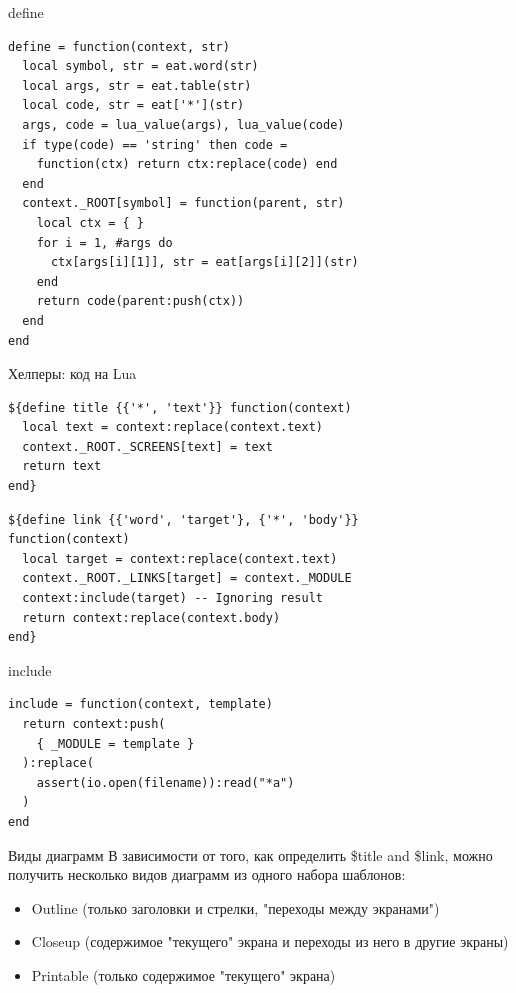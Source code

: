 \documentclass[aspectratio=169,handout,bigger]{beamer}
\begin{document}

\begin{frame}[fragile]{define}
\begin{verbatim}
define = function(context, str)
  local symbol, str = eat.word(str)
  local args, str = eat.table(str)
  local code, str = eat['*'](str)
  args, code = lua_value(args), lua_value(code)
  if type(code) == 'string' then code =
    function(ctx) return ctx:replace(code) end
  end
  context._ROOT[symbol] = function(parent, str)
    local ctx = { }
    for i = 1, #args do
      ctx[args[i][1]], str = eat[args[i][2]](str)
    end
    return code(parent:push(ctx))
  end
end
\end{verbatim}
\end{frame}


\begin{frame}[fragile]{Хелперы: код на Lua}
\begin{verbatim}
${define title {{'*', 'text'}} function(context)
  local text = context:replace(context.text)
  context._ROOT._SCREENS[text] = text
  return text
end}
\end{verbatim}

\begin{verbatim}
${define link {{'word', 'target'}, {'*', 'body'}}
function(context)
  local target = context:replace(context.text)
  context._ROOT._LINKS[target] = context._MODULE
  context:include(target) -- Ignoring result
  return context:replace(context.body)
end}
\end{verbatim}
\end{frame}


\begin{frame}[fragile]{include}
\begin{verbatim}
include = function(context, template)
  return context:push(
    { _MODULE = template }
  ):replace(
    assert(io.open(filename)):read("*a")
  )
end
\end{verbatim}
\end{frame}


\begin{frame}{Виды диаграмм}
  В зависимости от того, как определить \${title} and \${link},
  можно получить несколько видов диаграмм из одного набора шаблонов:

  \begin{itemize}
    \item Outline (только заголовки и стрелки, "переходы между экранами")
    \item Closeup (содержимое "текущего" экрана и переходы из него в другие экраны)
    \item Printable (только содержимое "текущего" экрана)
  \end{itemize}
\end{frame}
\end{document}

